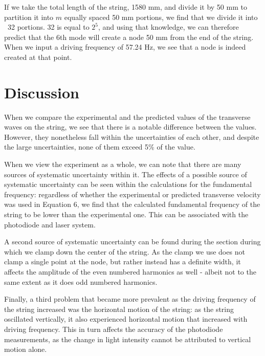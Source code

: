 \documentclass[twoside,twocolumn]{article}
\begin{document}
\noindent If we take the total length of the string, 1580 mm, and divide it by 50 mm to partition it into $m$ equally spaced 50 mm portions, we find that we divide it into ~32 portions. 32 is equal to $2^5$, and using that knowledge, we can therefore predict that the 6th mode will create a node 50 mm from the end of the string. When we input a driving frequency of 57.24 Hz, we see that a node is indeed created at that point.


\section{Discussion}

\noindent When we compare the experimental and the predicted values of the transverse waves on the string, we see that there is a notable difference between the values. However, they nonetheless fall within the uncertainties of each other, and despite the large uncertainties, none of them exceed 5\% of the value.

\hfill

\noindent When we view the experiment as a whole, we can note that there are many sources of systematic uncertainty within it. The effects of a possible source of systematic uncertainty can be seen within the calculations for the fundamental frequency: regardless of whether the experimental or predicted transverse velocity was used in Equation 6, we find that the calculated fundamental frequency of the string to be lower than the experimental one. This can be associated with the photodiode and laser system.

\hfill

\noindent A second source of systematic uncertainty can be found during the section during which we clamp down the center of the string. As the clamp we use does not clamp a single point at the node, but rather instead has a definite width, it affects the amplitude of the even numbered harmonics as well - albeit not to the same extent as it does odd numbered harmonics.

\hfill

\noindent Finally, a third problem that became more prevalent as the driving frequency of the string increased was the horizontal motion of the string: as the string oscillated vertically, it also experienced horizontal motion that increased with driving frequency. This in turn affects the accuracy of the photodiode measurements, as the change in light intensity cannot be attributed to vertical motion alone.
\end{document}
